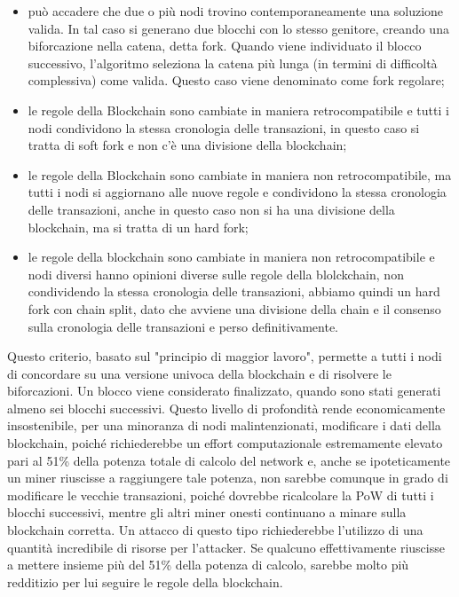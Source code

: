 \begin{itemize}
    \item può accadere che due o più nodi trovino contemporaneamente una soluzione valida. In tal caso si generano due blocchi con lo stesso genitore, creando una biforcazione nella catena, detta fork. Quando viene individuato il blocco successivo, l’algoritmo seleziona la catena più lunga (in termini di difficoltà complessiva) come valida. Questo caso viene denominato come fork regolare;
    \item le regole della Blockchain sono cambiate in maniera retrocompatibile e tutti i nodi condividono la stessa cronologia delle transazioni, in questo caso si tratta di soft fork e non c’è una divisione della blockchain;
    \item le regole della Blockchain sono cambiate in maniera non retrocompatibile, ma tutti i nodi si aggiornano alle nuove regole e condividono la stessa cronologia delle transazioni, anche in questo caso non si ha una divisione della blockchain, ma si tratta di un hard fork;
    \item le regole della blockchain sono cambiate in maniera non retrocompatibile e nodi diversi hanno opinioni diverse sulle regole della blolckchain, non condividendo la stessa cronologia delle transazioni, abbiamo quindi un hard fork con chain split, dato che avviene una divisione della chain e il consenso sulla cronologia delle transazioni e perso definitivamente.
\end{itemize}
Questo criterio, basato sul "principio di maggior lavoro", permette a tutti i nodi di concordare su una versione univoca della blockchain e di risolvere le biforcazioni. Un blocco viene considerato finalizzato, quando sono stati generati almeno sei blocchi successivi. Questo livello di profondità rende economicamente insostenibile, per una minoranza di nodi malintenzionati, modificare i dati della blockchain, poiché richiederebbe un effort computazionale estremamente elevato pari al 51\% della potenza totale di calcolo del network e, anche se ipoteticamente un miner riuscisse a raggiungere tale potenza, non sarebbe comunque in grado di modificare le vecchie transazioni, poiché dovrebbe ricalcolare la PoW di tutti i blocchi successivi, mentre gli altri miner onesti continuano a minare sulla blockchain corretta. Un attacco di questo tipo richiederebbe l’utilizzo di una quantità incredibile di risorse per l’attacker. Se qualcuno effettivamente riuscisse a mettere insieme più del 51\% della potenza di calcolo, sarebbe molto più redditizio per lui seguire le regole della blockchain.
